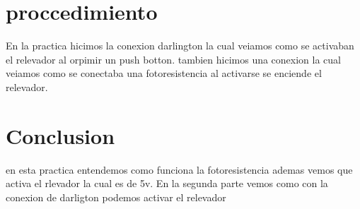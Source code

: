 \documentclass[12pt,a4paper]{article}
\begin{document}
\section{proccedimiento}
\begin{flushleft}
En la practica hicimos la conexion darlington la cual veiamos como se activaban el relevador al orpimir un push botton. tambien hicimos una conexion la cual veiamos como se conectaba una fotoresistencia al activarse se enciende el relevador.

\end{flushleft}
\section{Conclusion}
\begin{flushleft}
 en esta practica entendemos como funciona la fotoresistencia ademas vemos que activa el rlevador la cual es de 5v. En la segunda parte vemos como con la conexion de darligton podemos activar el relevador 

\end{flushleft}
\end{document}

